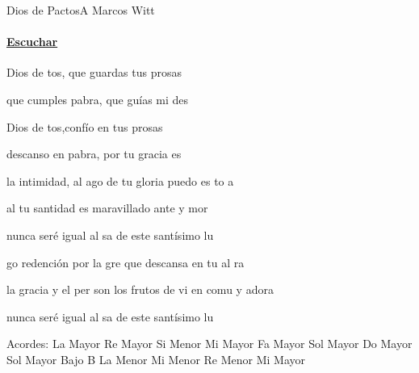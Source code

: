\documentclass[12pt, spanish]{book}
\begin{document}
    \begin{song}{Dios de Pactos}{A}
    {} %
    {Marcos Witt}
    {} %
    {}
        \ifChordBk
        \paragraph{\mbox{}\hfill\protect\href{https://open.spotify.com/intl-es/track/4wFBzIA7HuaaGz89DQnWyo}{Escuchar}\mbox{}\hfill}
        \fi

        \begin{SBChorus}
            Dios de tos, que guardas tus prosas

            que cumples  pabra, que guías mi des

            Dios de tos,confío en tus prosas

            descanso en  pabra, por tu gracia es 
        \end{SBChorus}

        \begin{SBOpGroup}
             la intimidad, al ago de tu gloria puedo es
            to a 

            al  tu santidad es maravillado ante  y  mor

            nunca  seré igual al sa de este santísimo lu
        \end{SBOpGroup}
        \vskip 20pt
        \begin{SBOpGroup}
            go redención por la gre que descansa en tu
            al ra 

            la gracia y el per son los frutos de vi en
            comu y adora

            nunca  seré igual al sa de este santísimo lu
        \end{SBOpGroup}

        \ifChordBk
        \begin{SBOpGroup}
            Acordes:\break
            \upchord{\A}\qquad La Mayor \hfill
            \upchord{\D}\qquad Re Mayor \hfill\null\break
            \upchord{\Bm}\qquad Si Menor \hfill
            \upchord{\E}\qquad Mi Mayor \hfill\null\break
            \upchord{\F}\qquad Fa Mayor \hfill
            \upchord{\G}\qquad Sol Mayor \hfill\null\break
            \upchord{\C}\qquad Do Mayor \hfill
            \upchord{\GB}\qquad Sol Mayor Bajo B \hfill\null\break
            \upchord{\Am}\qquad La Menor \hfill
            \upchord{\Em}\qquad Mi Menor \hfill\null\break
            \upchord{\Dm}\qquad Re Menor \hfill
            \upchord{\E}\qquad Mi Mayor \hfill\null\break
        \end{SBOpGroup}
        \fi
    \end{song}
\end{document}
